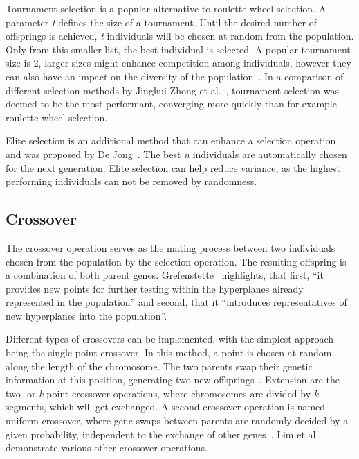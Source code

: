 Tournament selection is a popular alternative to roulette wheel selection. A parameter \textit{t} defines the size of a tournament. Until the desired number of offsprings is achieved, \textit{t} individuals will be chosen at random from the population. Only from this smaller list, the best individual is selected. A popular tournament size is 2, larger sizes might enhance competition among individuals, however they can also have an impact on the diversity of the population~\cite{hussain_trade-off_2020}. In a comparison of different selection methods by Jinghui Zhong et al.~\cite{jinghui_zhong_comparison_2005}, tournament selection was deemed to be the most performant, converging more quickly than for example roulette wheel selection.

Elite selection is an additional method that can enhance a selection operation and was proposed by De Jong~\cite{de_jong_analysis_1975}. The best \textit{n} individuals are automatically chosen for the next generation. Elite selection can help reduce variance, as the highest performing individuals can not be removed by randomness.

\subsection{Crossover}
The crossover operation serves as the mating process between two individuals chosen from the population by the selection operation. The resulting offspring is a combination of both parent genes. Grefenstette~\cite{grefenstette_optimization_1986} highlights, that first, \enquote{it provides new points for further testing within the hyperplanes already represented in the population} and second, that it \enquote{introduces representatives of new hyperplanes into the population}. 

Different types of crossovers can be implemented, with the simplest approach being the single-point crossover. In this method, a point is chosen at random along the length of the chromosome. The two parents swap their genetic information at this position, generating two new offsprings~\cite{katoch_review_2021}. Extension are the two- or \textit{k}-point crossover operations, where chromosomes are divided by \textit{k} segments, which will get exchanged. A second crossover operation is named uniform crossover, where gene swaps between parents are randomly decided by a given probability, independent to the exchange of other genes~\cite{katoch_review_2021}. Lim et al.~\cite{lim_crossover_2017} demonstrate various other crossover operations.

